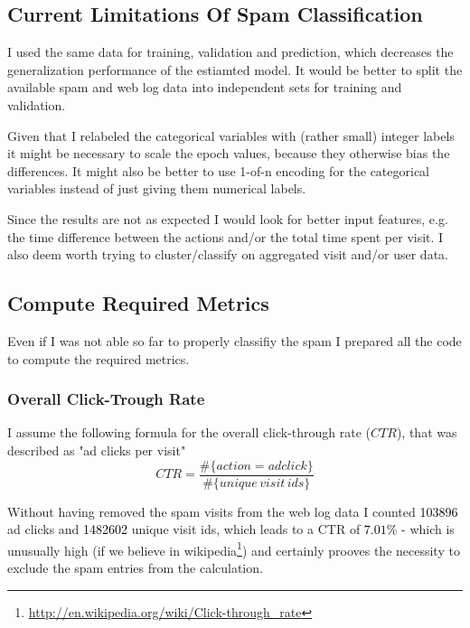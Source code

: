 \documentclass{article}\usepackage[]{graphicx}\usepackage[]{color}
\begin{document}
\subsection{Current Limitations Of Spam Classification} %
\label{sub:current_limitations}

I used the same data for training, validation and prediction, which decreases the generalization performance of the estiamted model. It would be better to split the available spam and web log data into independent sets for training and validation.

Given that I relabeled the categorical variables with (rather small) integer labels it might be necessary to scale the epoch values, because they otherwise bias the differences. It might also be better to use 1-of-n encoding for the categorical variables instead of just giving them numerical labels.


Since the results are not as expected I would look for better input features, e.g. the time difference between the actions and/or the total time spent per visit. I also deem worth trying to cluster/classify on aggregated visit and/or user data. %


\subsection{Compute Required Metrics} %
\label{sub:compute_metrics}

Even if I was not able so far to properly classifiy the spam I prepared all the code to compute the required metrics.

\subsubsection{Overall Click-Trough Rate} %
\label{subsub:ctr}

I assume the following formula for the overall click-through rate ($CTR$), that was described as "ad clicks per visit"
$$
CTR = \frac{ \#\{action=adclick\} }{ \#\{unique \, visit \, ids\}}
$$

Without having removed the spam visits from the web log data I counted \textcolor{black}{103896} ad clicks and \textcolor{black}{1482602} unique visit ids, which leads to a CTR of \textcolor{black}{$7.01\%$} - which is unusually high (if we believe in wikipedia\footnote{\url{http://en.wikipedia.org/wiki/Click-through_rate}}) and certainly prooves the necessity to exclude the spam entries from the calculation.
\end{document}
